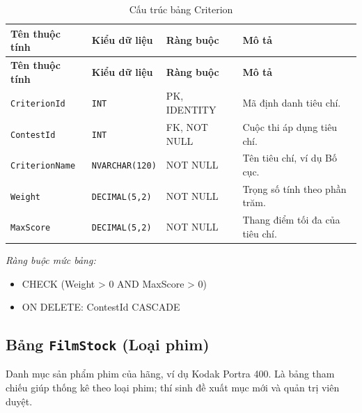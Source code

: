 \begin{longtable}{|L{4cm}|L{3.15cm}|L{2.4cm}|L{4.55cm}|}
\caption{Cấu trúc bảng Criterion} \\
\hline
\textbf{Tên thuộc tính} & \textbf{Kiểu dữ liệu} & \textbf{Ràng buộc} & \textbf{Mô tả} \\ \hline
\endfirsthead
\hline
\textbf{Tên thuộc tính} & \textbf{Kiểu dữ liệu} & \textbf{Ràng buộc} & \textbf{Mô tả} \\ \hline
\endhead
\texttt{CriterionId} & \texttt{INT} & PK, IDENTITY & Mã định danh tiêu chí. \\ \hline
\texttt{ContestId} & \texttt{INT} & FK, NOT NULL & Cuộc thi áp dụng tiêu chí. \\ \hline
\texttt{CriterionName} & \texttt{NVARCHAR(120)} & NOT NULL & Tên tiêu chí, ví dụ Bố cục. \\ \hline
\texttt{Weight} & \texttt{DECIMAL(5,2)} & NOT NULL & Trọng số tính theo phần trăm. \\ \hline
\texttt{MaxScore} & \texttt{DECIMAL(5,2)} & NOT NULL & Thang điểm tối đa của tiêu chí. \\ \hline
\end{longtable}

\noindent\textit{Ràng buộc mức bảng:}

\begin{itemize}\raggedright
    \item CHECK (Weight > 0 AND MaxScore > 0)
    \item ON DELETE: ContestId CASCADE
\end{itemize}

\subsection{Bảng \texttt{FilmStock} (Loại phim)}

Danh mục sản phẩm phim của hãng, ví dụ Kodak Portra 400. Là bảng tham chiếu giúp thống kê theo loại phim; thí sinh đề xuất mục mới và quản trị viên duyệt.

